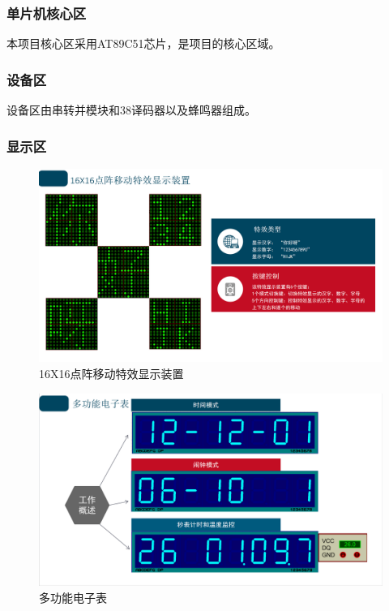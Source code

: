 \documentclass{textreportclass}  %
\begin{document}
	
	\subsubsection{单片机核心区}
	本项目核心区采用AT89C51芯片，是项目的核心区域。

	
	\subsubsection{设备区}
	设备区由串转并模块和38译码器以及蜂鸣器组成。
	
	\subsubsection{显示区}

	\begin{figure}[htbp]
	\centering
	\includegraphics[scale=0.2]{Fig/显示区1.png}
	\caption{16X16点阵移动特效显示装置}\label{Fig.34}
	\end{figure}

	\begin{figure}[htbp]
	\centering
	\includegraphics[scale=0.2]{Fig/显示区2.png}
	\caption{多功能电子表}\label{Fig.35}
	\end{figure}
\end{document}
